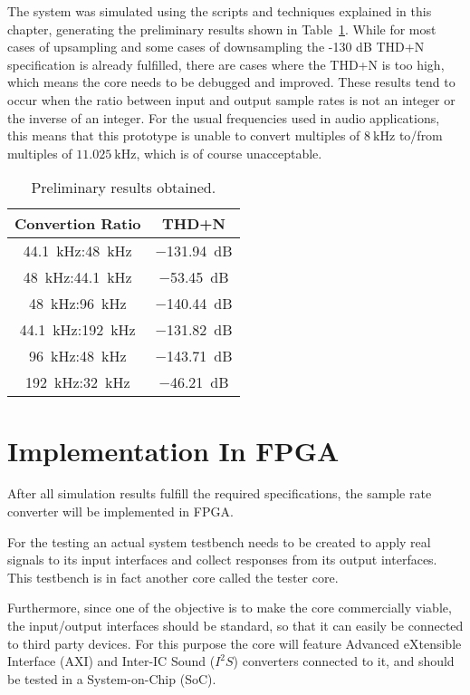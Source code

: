 The system was simulated using the scripts and techniques explained in this
chapter, generating the preliminary results shown in
Table~\ref{tab:prel_results}. While for most cases of upsampling and some cases
of downsampling the -130 dB THD+N specification is already fulfilled, there are
cases where the THD+N is too high, which means the core needs to be
debugged and improved. These results tend to occur when the ratio between input
and output sample rates is not an integer or the inverse of an integer. For the
usual frequencies used in audio applications, this means that this prototype is
unable to convert multiples of $\SI{8}{\kilo\hertz}$ to/from multiples of
$\SI{11.025}{\kilo\hertz}$, which is of course unacceptable.

\begin{table}[!htbp]
  \centering
  \caption{Preliminary results obtained.}
  \label{tab:prel_results}
  \begin{tabular}{|c|c|}
    \hline 
	{\bf Convertion Ratio} & {\bf THD+N}\\ \hline
        \SI{44.1}{\kilo\hertz}:\SI{48}{\kilo\hertz} & \SI{-131.94}{\dB} \\ \hline
\SI{48}{\kilo\hertz}:\SI{44.1}{\kilo\hertz} & \SI{-53.45}{\dB} \\ \hline
\SI{48}{\kilo\hertz}:\SI{96}{\kilo\hertz} & \SI{-140.44}{\dB} \\ \hline
\SI{44.1}{\kilo\hertz}:\SI{192}{\kilo\hertz} & \SI{-131.82}{\dB} \\ \hline
\SI{96}{\kilo\hertz}:\SI{48}{\kilo\hertz} & \SI{-143.71}{\dB} \\ \hline
\SI{192}{\kilo\hertz}:\SI{32}{\kilo\hertz} & \SI{-46.21}{\dB} \\ \hline
  \end{tabular}
\end{table}

\section{Implementation In FPGA}
\label{section:impl}

After all simulation results fulfill the required specifications, the sample
rate converter will be implemented in FPGA.

For the testing an actual system testbench needs to be created to apply real
signals to its input interfaces and collect responses from its output
interfaces. This testbench is in fact another core called the tester core.

Furthermore, since one of the objective is to make the core commercially viable,
the input/output interfaces should be standard, so that it can easily be
connected to third party devices.  For this purpose the core will feature
Advanced eXtensible Interface (AXI) and Inter-IC Sound ($I^2S$) converters
connected to it, and should be tested in a System-on-Chip (SoC).

